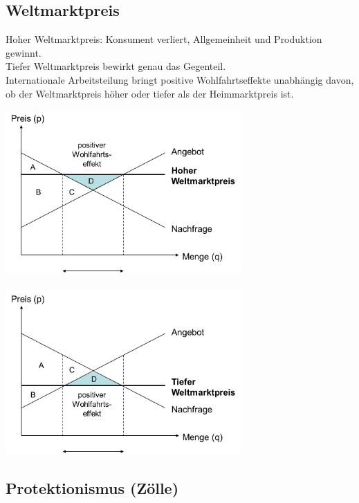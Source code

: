 \subsection{Weltmarktpreis}
Hoher Weltmarktpreis: Konsument verliert, Allgemeinheit und Produktion gewinnt.\\
Tiefer Weltmarktpreis bewirkt genau das Gegenteil.\\
Internationale Arbeitsteilung bringt positive Wohlfahrtseffekte unabhängig
davon, ob der Weltmarktpreis höher oder tiefer als der Heimmarktpreis ist.
\begin{multicols}{2}
	\includegraphics[width=9cm]{images/h03f11.png}\\
	\columnbreak\\
	\includegraphics[width=9cm]{images/h03f13.png}
\end{multicols}
\subsection{Protektionismus (Zölle)}